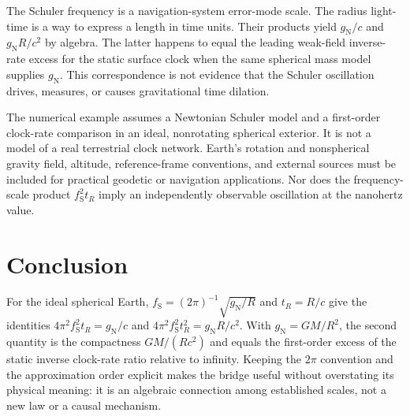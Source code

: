 \documentclass[12pt]{article}
\begin{document}
The Schuler frequency is a navigation-system error-mode scale. The radius light-time is a way to express a length in time units. Their products yield $g_{\mathrm{N}}/c$ and $g_{\mathrm{N}}R/c^2$ by algebra. The latter happens to equal the leading weak-field inverse-rate excess for the static surface clock when the same spherical mass model supplies $g_{\mathrm{N}}$. This correspondence is not evidence that the Schuler oscillation drives, measures, or causes gravitational time dilation.

The numerical example assumes a Newtonian Schuler model and a first-order clock-rate comparison in an ideal, nonrotating spherical exterior. It is not a model of a real terrestrial clock network. Earth's rotation and nonspherical gravity field, altitude, reference-frame conventions, and external sources must be included for practical geodetic or navigation applications. Nor does the frequency-scale product $f_{\mathrm{S}}^2t_R$ imply an independently observable oscillation at the nanohertz value.

\section{Conclusion}

For the ideal spherical Earth, $f_{\mathrm{S}}=(2\pi)^{-1}\sqrt{g_{\mathrm{N}}/R}$ and $t_R=R/c$ give the identities $4\pi^2f_{\mathrm{S}}^2t_R=g_{\mathrm{N}}/c$ and $4\pi^2f_{\mathrm{S}}^2t_R^2=g_{\mathrm{N}}R/c^2$. With $g_{\mathrm{N}}=GM/R^2$, the second quantity is the compactness $GM/(Rc^2)$ and equals the first-order excess of the static inverse clock-rate ratio relative to infinity. Keeping the $2\pi$ convention and the approximation order explicit makes the bridge useful without overstating its physical meaning: it is an algebraic connection among established scales, not a new law or a causal mechanism.
\end{document}
